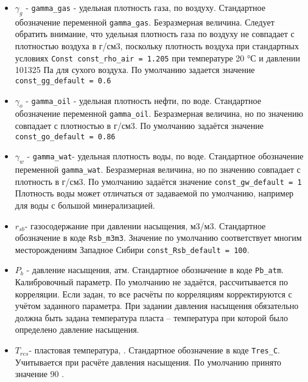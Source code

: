 \begin{itemize}
	
\item	$\gamma_g$  - \texttt{gamma_gas} - удельная плотность газа, по воздуху. Стандартное обозначение переменной \texttt{gamma_gas}. Безразмерная величина. Следует обратить внимание, что удельная плотность газа по воздуху не совпадает с плотностью воздуха в г/см3, поскольку плотность воздуха при стандартных условиях \texttt{Const const_rho_air = 1.205} при температуре 20 °С и давлении 101325 Па для сухого воздуха. По умолчанию задается значение \texttt{const_gg_default = 0.6}

\item $\gamma_o$  - \texttt{gamma_oil} - удельная плотность нефти, по воде. Стандартное обозначение переменной \texttt{gamma_oil}. Безразмерная величина, но по значению совпадает с плотностью в г/см3. По умолчанию задаётся значение \texttt{const_go_default = 0.86}

\item $\gamma_w$  - \texttt{gamma_wat}- удельная плотность воды, по воде. Стандартное обозначение переменной \texttt{gamma_wat}. Безразмерная величина, но по значению совпадает с плотность в г/см3. По умолчанию задаётся значение \texttt{const_gw_default = 1} Плотность воды может отличаться от задаваемой по умолчанию, например для воды с большой минерализацией.  

\item $r_{sb}$- газосодержание при давлении насыщения, м3/м3. Стандартное обозначение в коде \texttt{Rsb_m3m3}. Значение по умолчанию соответствует многим месторождениям Западное Сибири \texttt{const_Rsb_default = 100}.

\item $P_b$ - давление насыщения, атм. Стандартное обозначение в коде \texttt{Pb_atm}. Калибровочный параметр. По умолчанию не задаётся, рассчитывается по корреляции. Если задан, то все расчёты по корреляциям корректируются с учётом заданного параметра. При задании давления насыщения обязательно должна быть задана температура пласта – температура при которой было определено давление насыщения. 

\item $T_{res}$- пластовая температура, \textcelsius. Стандартное обозначение в коде \texttt{Tres_C}. Учитывается при расчёте давления насыщения. По умолчанию принято значение 90 \textcelsius.


\end{itemize}
